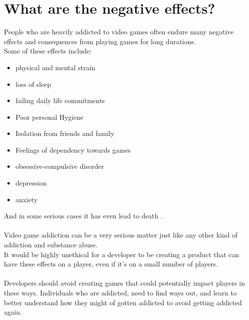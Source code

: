 \documentclass{scrartcl}
\begin{document}
\section{What are the negative effects?}
People who are heavily addicted to video games often endure many negative effects and consequences from playing games for long durations.\cite{Addiction3}
\\
Some of these effects include:
\begin{itemize}
  \item physical and mental strain
  \item loss of sleep
  \item failing daily life commitments
  \item Poor personal Hygiene
  \item Isolation from friends and family
  \item Feelings of dependency towards games
  \item obsessive-compulsive disorder
  \item depression
  \item anxiety
\end{itemize}
And in some serious cases it has even lead to death \cite{parkin2015death}.
\\
\\
Video game addiction can be a very serious matter just like any other kind of addiction and substance abuse.\cite{Addiction1, Addiction2, Addiction3}
\\
It would be highly unethical for a developer to be creating a product that can have these effects on a player, even if it's on a small number of players.
\\
\\
Developers should avoid creating games that could potentially impact players in these ways.\cite{Ethics1} Individuals who are addicted, need to find ways out, and learn to better understand how they might of gotten addicted to avoid getting addicted again.
\end{document}
